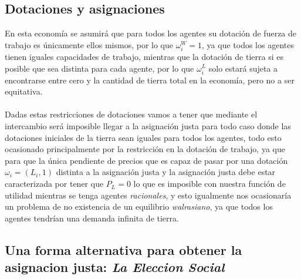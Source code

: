 \documentclass[11pt]{article}
\begin{document}
{\subsection{Dotaciones y asignaciones}

\begin{flushleft}
    En esta economía se asumirá que para todos los agentes su dotación de fuerza de trabajo es únicamente ellos mismos,
    por lo que $\omega_i^W=1$, ya que todos los agentes tienen iguales capacidades de trabajo, mientras que la dotación de tierra
    si es posible que sea distinta para cada agente, por lo que $\omega_i^L$ solo estará sujeta a encontrarse entre cero y
    la cantidad de tierra total en la economía, pero no a ser equitativa.
    \\~\\
    Dadas estas restricciones de dotaciones vamos a tener que mediante el intercambio será imposible llegar a la asignación justa
    para todo caso donde las dotaciones iniciales de la tierra sean iguales para todos los agentes, todo esto ocasionado principalmente 
    por la restricción en la dotación de trabajo, ya que para que la única pendiente de precios que es capaz de pasar por una dotación $\omega_i=(L_i,1)$ distinta a la asignación justa
    y la asignación justa debe estar caracterizada por tener que $P_L=0$ lo que es imposible con nuestra función de utilidad mientras se tenga agentes \textit{racionales},
    y esto igualmente nos ocasionaría un problema de no existencia de un equilibrio \textit{walrasiano}, ya que todos los agentes tendrían una demanda infinita de tierra.    \subsection{Una forma alternativa para obtener la asignacion justa: \textit{La Eleccion Social}}
    

\end{flushleft}}
\end{document}

